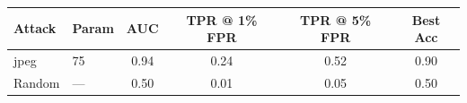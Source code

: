 \begin{tabular}{llcccc}
\toprule
Attack & Param & AUC & TPR @ 1\% FPR & TPR @ 5\% FPR & Best Acc \\
\midrule
jpeg & 75 & 0.94 & 0.24 & 0.52 & 0.90 \\
Random & — & 0.50 & 0.01 & 0.05 & 0.50 \\
\bottomrule
\end{tabular}
